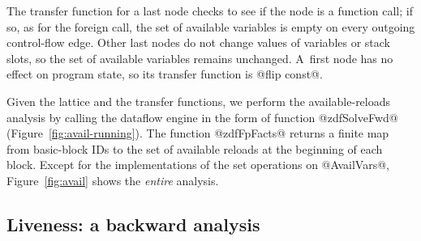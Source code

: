 \documentclass[blockstyle,preprint,nocopyrightspace]{sigplanconf}
\newcommand\seclabel[1]{\label{sec:#1}}
\newcommand\figref[1]{Figure~\ref{fig:#1}}
\begin{document}
The transfer function for a last node checks to see if the node is a
function call; if so, as for the foreign call, the set of
available variables is empty on every outgoing control-flow edge.
Other last nodes do not change values of variables or stack slots, 
so the set of available variables remains unchanged.
%
A~first node has no effect on program state, so its transfer function
is @flip const@.


Given the lattice and the transfer functions,
we perform the available-reloads analysis by calling
the dataflow engine in the form of function @zdfSolveFwd@
(\figref{avail-running}).
The function @zdfFpFacts@ returns 
a finite map from basic-block IDs to the set of available reloads
at the beginning of each block.
Except for the implementations of the set operations on @AvailVars@,
\figref{avail} shows the \emph{entire} analysis.


\subsection{Liveness: a backward analysis} 

\seclabel{liveness}
\end{document}
